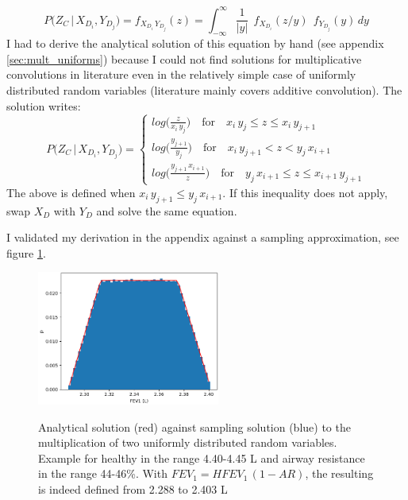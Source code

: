 \begin{equation}
P\bigl(Z_C \,|\,
   X_{D_i}, Y_{D_j}\bigr) =
   f_{X_{D_i}\,Y_{D_j}}(z) =
    \int_{-\infty}^{\infty} \frac{1}{|y|}\ \ f_{X_{D_i}}\!(z/y)\ \ f_{Y_{D_j}}\!(y)\,dy
\end{equation}
I had to derive the analytical solution of this equation by hand (see appendix \ref{sec:mult_uniforms}) because I could not find solutions for multiplicative convolutions in literature even in the relatively simple case of uniformly distributed random variables (literature mainly covers additive convolution). The solution writes:
\begin{equation}
P\bigl(Z_C \,|\,
   X_{D_i}, Y_{D_j}\bigr)
 =  
\begin{cases}    
  log\Bigr(\frac{z}{x_i\, y_j}\bigr)\quad\text{for}\quad x_i\, y_j\le z\le x_i\, y_{j+1}\\
  log\Bigr(\frac{y_{j+1}}{y_j}\Bigr)\quad \text{for}\quad x_i\, y_{j+1}< z< y_j\, x_{i+1}\\
  log\Bigr(\frac{y_{j+1}\, x_{i+1}}{z}\Bigr)\quad \text{for}\quad y_j\, x_{i+1}\le z\le x_{i+1}\, y_{j+1}
\end{cases}
\end{equation}
The above is defined when $x_i\, y_{j+1} \le y_j\, x_{i+1}$. If this inequality does not apply, swap $X_D$ with $Y_D$ and solve the same equation.

I validated my derivation in the appendix against a sampling approximation, see figure \ref{fig:analytical_vs_sampling}.
\begin{figure}[!h]
    \caption{Analytical solution (red) against sampling solution (blue) to the multiplication of two uniformly distributed random variables. Example for healthy \F in the range 4.40-4.45 L and airway resistance in the range 44-46\%. With $F\!EV_1 = H\!F\!EV_1\,(1\!-\!A\!R)$, the resulting \F is indeed defined from 2.288 to 2.403 L}
    \centering
    \includegraphics[width=60mm]{Chapter1/Figs/analytical_vs_sampling.png}
    \label{fig:analytical_vs_sampling}
\end{figure}

